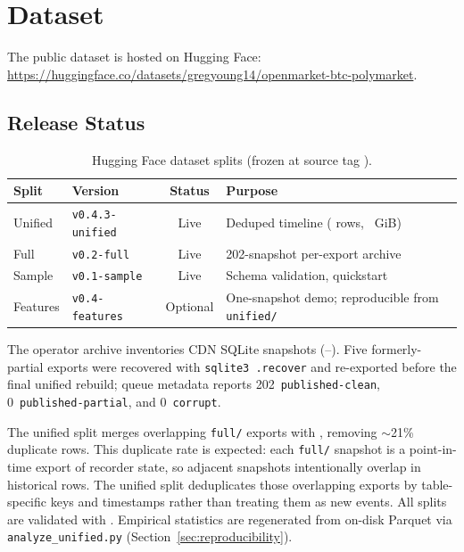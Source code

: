 \section{Dataset}
\label{sec:dataset}

The public dataset is hosted on Hugging Face:
\url{https://huggingface.co/datasets/gregyoung14/openmarket-btc-polymarket}.

\subsection{Release Status}
\label{sec:dataset-status}

\begin{table}[t]
  \centering
  \caption{Hugging Face dataset splits (frozen at source tag \OpenMarketReleaseTag{}).}
  \label{tab:dataset-splits}
  \small
  \begin{tabular}{@{}llcp{3.8cm}@{}}
    \toprule
    Split & Version & Status & Purpose \\
    \midrule
    Unified  & \texttt{v0.4.3-unified} & Live &
      Deduped timeline (\OpenMarketTotalRows{} rows, \OpenMarketUnifiedGiB{}~GiB) \\
    Full     & \texttt{v0.2-full}        & Live &
      202-snapshot per-export archive \\
    Sample   & \texttt{v0.1-sample}      & Live &
      Schema validation, quickstart \\
    Features & \texttt{v0.4-features}    & Optional &
      One-snapshot demo; reproducible from \texttt{unified/} \\
    \bottomrule
  \end{tabular}
\end{table}

The operator archive inventories \OpenMarketSnapshots{} CDN SQLite snapshots
(\OpenMarketCollectionStart{}--\OpenMarketCollectionEnd{}). Five formerly-partial
exports were recovered with \texttt{sqlite3 .recover} and re-exported before
the final unified rebuild; queue metadata reports 202~\texttt{published-clean},
0~\texttt{published-partial}, and 0~\texttt{corrupt}.

The unified split merges overlapping \texttt{full/} exports with
, removing ${\sim}$21\% duplicate
rows. This duplicate rate is expected: each \texttt{full/} snapshot is a
point-in-time export of recorder state, so adjacent snapshots intentionally
overlap in historical rows. The unified split deduplicates those overlapping
exports by table-specific keys and timestamps rather than treating them as new
events. All splits are validated with
. Empirical statistics are regenerated
from on-disk Parquet via \texttt{analyze\_unified.py} (Section~\ref{sec:reproducibility}).


